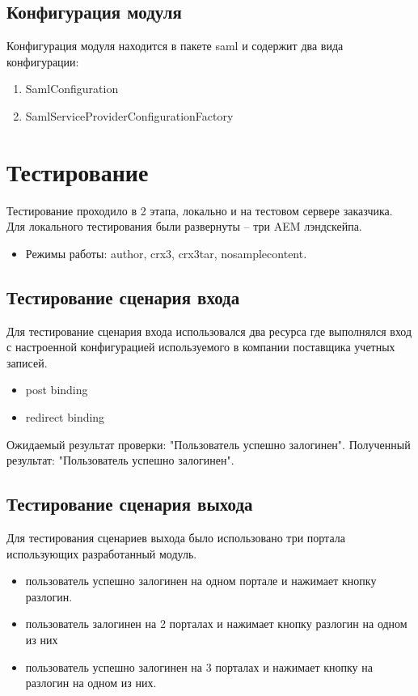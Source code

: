 \subsection{Конфигурация модуля}
Конфигурация модуля находится в пакете saml и содержит два вида конфигурации:
\begin{enumerate}
\item SamlConfiguration
\item SamlServiceProviderConfigurationFactory
\end{enumerate}

\section{Тестирование}

Тестирование проходило в 2 этапа, локально и на тестовом сервере заказчика.
Для локального тестирования были развернуты – три AEM лэндскейпа.
\begin{itemize}
\item Режимы работы: author, crx3, crx3tar, nosamplecontent.
\end{itemize}

\subsection{Тестирование сценария входа}
Для тестирование сценария входа использовался два ресурса где выполнялся вход с настроенной конфигурацией используемого в компании поставщика учетных записей.
\begin{itemize}
\item post binding
\item redirect binding
\end{itemize}

Ожидаемый результат проверки: "Пользователь успешно залогинен". 
Полученный результат: "Пользователь успешно залогинен".

\subsection{Тестирование сценария выхода}
Для тестирования сценариев выхода было использовано три портала использующих разработанный модуль.
\begin{itemize}
\item пользователь успешно залогинен на одном портале и нажимает кнопку разлогин.
\item пользователь залогинен на 2 порталах и нажимает кнопку разлогин на одном из них
\item пользователь успешно залогинен на 3 порталах и нажимает кнопку на разлогин на одном из них.
\end{itemize}

